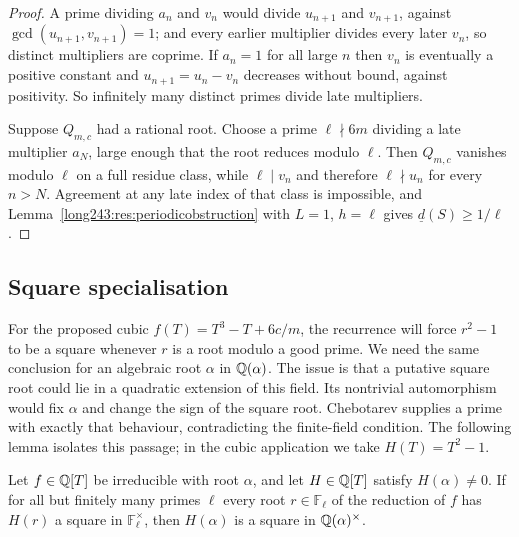 \documentclass[11pt]{article}
\newcommand{\Fp}{\mathbb{F}}
\begin{document}
\begin{proof}
A prime dividing $a_n$ and $v_n$ would divide $u_{n+1}$ and $v_{n+1}$, against
$\gcd(u_{n+1},v_{n+1})=1$; and every earlier multiplier divides every later
$v_n$, so distinct multipliers are coprime.  If $a_n=1$ for all large $n$ then
$v_n$ is eventually a positive constant and $u_{n+1}=u_n-v_n$ decreases without
bound, against positivity.  So infinitely many distinct primes divide late
multipliers.

Suppose $Q_{m,c}$ had a rational root.  Choose a prime $\ell\nmid6m$ dividing a
late multiplier $a_N$, large enough that the root reduces modulo $\ell$.  Then
$Q_{m,c}$ vanishes modulo $\ell$ on a full residue class, while $\ell\mid v_n$
and therefore $\ell\nmid u_n$ for every $n>N$.  Agreement at any late index of
that class is impossible, and
Lemma~\ref{long243:res:periodicobstruction} with $L=1$, $h=\ell$ gives
$\underline d(S)\ge1/\ell$.
\end{proof}

\subsection{Square specialisation}

For the proposed cubic $f(T)=T^3-T+6c/m$, the recurrence will force
$r^2-1$ to be a square whenever $r$ is a root modulo a good prime.
We need the same conclusion for an algebraic root $\alpha$ in
$\mathbb{Q}(\alpha)$. The issue is that a putative square root could lie in a
quadratic extension of this field. Its nontrivial automorphism would
fix $\alpha$ and change the sign of the square root. Chebotarev supplies
a prime with exactly that behaviour, contradicting the finite-field
condition. The following lemma isolates this passage; in the cubic
application we take $H(T)=T^2-1$.

\begin{lemma}\label{long243:res:squarespec}
Let $f\in\mathbb{Q}[T]$ be irreducible with root $\alpha$, and let $H\in\mathbb{Q}[T]$ satisfy
$H(\alpha)\ne0$.  If for all but finitely many primes $\ell$ every root
$r\in\Fp_\ell$ of the reduction of $f$ has $H(r)$ a square in $\Fp_\ell^\times$,
then $H(\alpha)$ is a square in $\mathbb{Q}(\alpha)^\times$.
\end{lemma}
\end{document}
